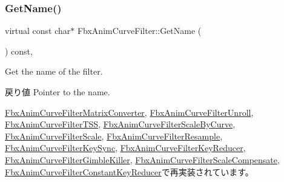 \mbox{\label{class_fbx_anim_curve_filter_abd559d5052fbb072042e59241940a35c}} 
\subsubsection{\texorpdfstring{Get\+Name()}{GetName()}}
{\footnotesize\ttfamily virtual const char$\ast$ Fbx\+Anim\+Curve\+Filter\+::\+Get\+Name (\begin{DoxyParamCaption}{ }\end{DoxyParamCaption}) const\hspace{0.3cm}{\ttfamily [inline]}, {\ttfamily [virtual]}}

Get the name of the filter. \begin{DoxyReturn}{戻り値}
Pointer to the name. 
\end{DoxyReturn}


\hyperlink{class_fbx_anim_curve_filter_matrix_converter_a264eb163214f398627f4b8e20631b1ab}{Fbx\+Anim\+Curve\+Filter\+Matrix\+Converter}, \hyperlink{class_fbx_anim_curve_filter_unroll_a01282004cc60febeff844d9c44f94e5c}{Fbx\+Anim\+Curve\+Filter\+Unroll}, \hyperlink{class_fbx_anim_curve_filter_t_s_s_acf96262688c855b1c9b5ead93247e758}{Fbx\+Anim\+Curve\+Filter\+T\+SS}, \hyperlink{class_fbx_anim_curve_filter_scale_by_curve_a99e99cf6db71774d394010c4cd295fdb}{Fbx\+Anim\+Curve\+Filter\+Scale\+By\+Curve}, \hyperlink{class_fbx_anim_curve_filter_scale_afffa13f0b3bbdcaa0a6d88d6aea2c83f}{Fbx\+Anim\+Curve\+Filter\+Scale}, \hyperlink{class_fbx_anim_curve_filter_resample_a67303296eba915d2a9fde63c2557c3f9}{Fbx\+Anim\+Curve\+Filter\+Resample}, \hyperlink{class_fbx_anim_curve_filter_key_sync_acf561aadd8d5f4b35826044c6d50b6b4}{Fbx\+Anim\+Curve\+Filter\+Key\+Sync}, \hyperlink{class_fbx_anim_curve_filter_key_reducer_a86d571282e550eecbf7afb0f198ce91f}{Fbx\+Anim\+Curve\+Filter\+Key\+Reducer}, \hyperlink{class_fbx_anim_curve_filter_gimble_killer_a224d34ab4b2a7f508de5679402c3711f}{Fbx\+Anim\+Curve\+Filter\+Gimble\+Killer}, \hyperlink{class_fbx_anim_curve_filter_scale_compensate_af6564ed47826563b148a2c41901e4f03}{Fbx\+Anim\+Curve\+Filter\+Scale\+Compensate}, \hyperlink{class_fbx_anim_curve_filter_constant_key_reducer_a1f856490df5d301d1c1e202958a3240c}{Fbx\+Anim\+Curve\+Filter\+Constant\+Key\+Reducer}で再実装されています。



